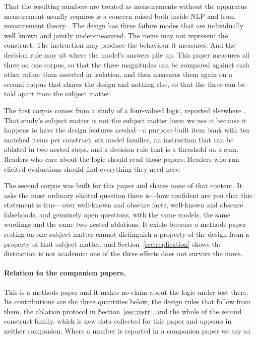 \documentclass[11pt,letterpaper]{article}
\begin{document}
That the resulting numbers are treated as measurements without the apparatus measurement
usually requires is a concern raised both inside NLP \citep{bowmandahl2021} and from
measurement theory \citep{jacobs2021measurement}. The design has three failure modes that
are individually well known and jointly under-measured.
The items may not represent the construct. The instruction may produce the behaviour it
measures. And the decision rule may sit where the model's answers pile up. This paper measures
all three on one corpus, so that the three magnitudes can be compared against each other rather
than asserted in isolation, and then measures them again on a second corpus that shares the
design and nothing else, so that the three can be told apart from the subject matter.

The first corpus comes from a study of a four-valued logic, reported elsewhere
\citep{leyva2026ladder, leyva2026itembank}. That study's subject matter is not the subject
matter here; we use it because it happens to have the design features needed---a purpose-built
item bank with ten matched items per construct, six model families, an instruction that can be
ablated in two nested steps, and a decision rule that is a threshold on a sum. Readers who care
about the logic should read those papers. Readers who run elicited evaluations should find
everything they need here.

The second corpus was built for this paper and shares none of that content. It asks the most
ordinary elicited question there is---how confident are you that this statement is
true---over well-known and obscure facts, well-known and obscure falsehoods, and genuinely open
questions, with the same models, the same wordings and the same two nested ablations. It exists
because a methods paper resting on one subject matter cannot distinguish a property of the design
from a property of that subject matter, and Section~\ref{sec:replication} shows the distinction
is not academic: one of the three effects does not survive the move.

\paragraph{Relation to the companion papers.} This is a methods paper and it makes no claim
about the logic under test there. Its contributions are the three quantities below, the design
rules that follow from them, the ablation protocol in Section~\ref{sec:instr}, and the whole of
the second construct family, which is new data collected for this paper and appears in neither
companion. Where a number is reported in a companion paper we say so.
\end{document}
